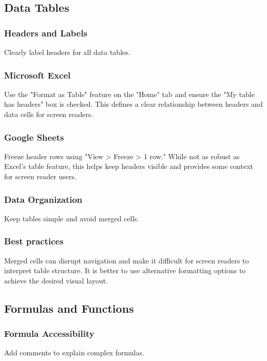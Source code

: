 \subsection{Data Tables}\label{ch15:ssec:data-tables}

\subsubsection{Headers and Labels}\label{ch15:sssec:headers-labels}
Clearly label headers for all data tables.

\subsubsection{Microsoft Excel}\label{ch15:sssec:excel-headers-labels}
Use the "Format as Table" feature on the "Home" tab and ensure the "My table has headers" box is checked. This defines a clear relationship between headers and data cells for screen readers.

\subsubsection{Google Sheets}\label{ch15:sssec:sheets-headers-labels}
Freeze header rows using "View > Freeze > 1 row." While not as robust as Excel's table feature, this helps keep headers visible and provides some context for screen reader users.

\subsubsection{Data Organization}\label{ch15:sssec:data-org}
Keep tables simple and avoid merged cells.

\subsubsection{Best practices}\label{ch15:sssec:data-org-best-practices}
Merged cells can disrupt navigation and make it difficult for screen readers to interpret table structure. It is better to use alternative formatting options to achieve the desired visual layout.

\subsection{Formulas and Functions}\label{ch15:ssec:formulas-functions}

\subsubsection{Formula Accessibility}\label{ch15:sssec:formula-accessibility}
Add comments to explain complex formulas.

